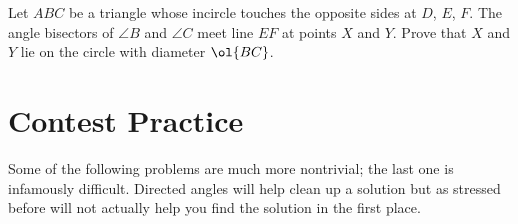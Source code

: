 \documentclass[11pt]{scrartcl}
\begin{document}
\begin{problem}
  Let $ABC$ be a triangle whose incircle touches the opposite sides
  at $D$, $E$, $F$.
  The angle bisectors of $\angle B$ and $\angle C$ meet
  line $EF$ at points $X$ and $Y$.
  Prove that $X$ and $Y$ lie on the circle with diameter $\ol{BC}$.
\end{problem}

\section{Contest Practice}
Some of the following problems are much more nontrivial;
the last one is infamously difficult.
Directed angles will help clean up a solution
but as stressed before will not actually help you find
the solution in the first place.
\end{document}

